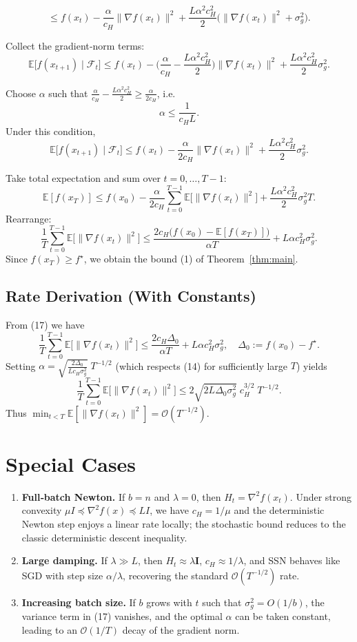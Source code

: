 \documentclass{article}
\newcommand{\E}{\mathbb{E}}
\newcommand{\Id}{\mathbf I}
\begin{document}
\begin{enumerate}[label={[\arabic*]}]
\[\le f(x_t)-\frac{\alpha}{c_H}\|\nabla f(x_t)\|^2
   +\frac{L\alpha^2c_H^2}{2}\big(\|\nabla f(x_t)\|^2+\sigma_g^2\big).
\tag{12}
\]
\item Collect the gradient‑norm terms:
\[
\E\big[f(x_{t+1})\mid\mathcal{F}_t\big]
\le f(x_t)-\Big(\frac{\alpha}{c_H}-\frac{L\alpha^2c_H^2}{2}\Big)\|\nabla f(x_t)\|^2
   +\frac{L\alpha^2c_H^2}{2}\sigma_g^2.
\tag{13}
\]
\item Choose $\alpha$ such that $\frac{\alpha}{c_H}-\frac{L\alpha^2c_H^2}{2}\ge \frac{\alpha}{2c_H}$, i.e.
\[
\alpha\le\frac{1}{c_H L}.
\tag{14}
\]
Under this condition,
\[
\E\big[f(x_{t+1})\mid\mathcal{F}_t\big]
\le f(x_t)-\frac{\alpha}{2c_H}\|\nabla f(x_t)\|^2
   +\frac{L\alpha^2c_H^2}{2}\sigma_g^2.
\tag{15}
\]
\item Take total expectation and sum over $t=0,\dots,T-1$:
\[
\E[f(x_T)]\le f(x_0)-\frac{\alpha}{2c_H}\sum_{t=0}^{T-1}\E\big[\|\nabla f(x_t)\|^2\big]
   +\frac{L\alpha^2c_H^2}{2}\sigma_g^2 T.
\tag{16}
\]
Rearrange:
\[
\frac{1}{T}\sum_{t=0}^{T-1}\E\big[\|\nabla f(x_t)\|^2\big]
\le \frac{2c_H\big(f(x_0)-\E[f(x_T)]\big)}{\alpha T}
   +L\alpha c_H^2\sigma_g^2.
\tag{17}
\]
Since $f(x_T)\ge f^\star$, we obtain the bound (1) of Theorem~\ref{thm:main}.
\end{enumerate}

\subsection*{Rate Derivation (With Constants)}
From (17) we have
\[
\frac{1}{T}\sum_{t=0}^{T-1}\E\big[\|\nabla f(x_t)\|^2\big]
\le \frac{2c_H\Delta_0}{\alpha T}+L\alpha c_H^2\sigma_g^2,
\quad\Delta_0:=f(x_0)-f^\star.
\]
Setting $\alpha=\sqrt{\frac{2\Delta_0}{L c_H\sigma_g^2}}\;T^{-1/2}$ (which respects (14) for sufficiently large $T$) yields
\[
\frac{1}{T}\sum_{t=0}^{T-1}\E\big[\|\nabla f(x_t)\|^2\big]
\le 2\sqrt{2L\Delta_0\sigma_g^2}\;c_H^{3/2}\;T^{-1/2}.
\]
Thus $\min_{t<T}\E[\|\nabla f(x_t)\|^2]=\mathcal{O}(T^{-1/2})$.

\section*{Special Cases}
\begin{enumerate}[label={\arabic*.}]
\item \textbf{Full‑batch Newton.} If $b=n$ and $\lambda=0$, then $H_t=\nabla^2 f(x_t)$. Under strong convexity $\mu I\preceq\nabla^2 f(x)\preceq L I$, we have $c_H=1/\mu$ and the deterministic Newton step enjoys a linear rate locally; the stochastic bound reduces to the classic deterministic descent inequality.
\item \textbf{Large damping.} If $\lambda\gg L$, then $H_t\approx\lambda\Id$, $c_H\approx 1/\lambda$, and SSN behaves like SGD with step size $\alpha/\lambda$, recovering the standard $\mathcal{O}(T^{-1/2})$ rate.
\item \textbf{Increasing batch size.} If $b$ grows with $t$ such that $\sigma_g^2=O(1/b)$, the variance term in (17) vanishes, and the optimal $\alpha$ can be taken constant, leading to an $\mathcal{O}(1/T)$ decay of the gradient norm.
\end{enumerate}
\end{document}

